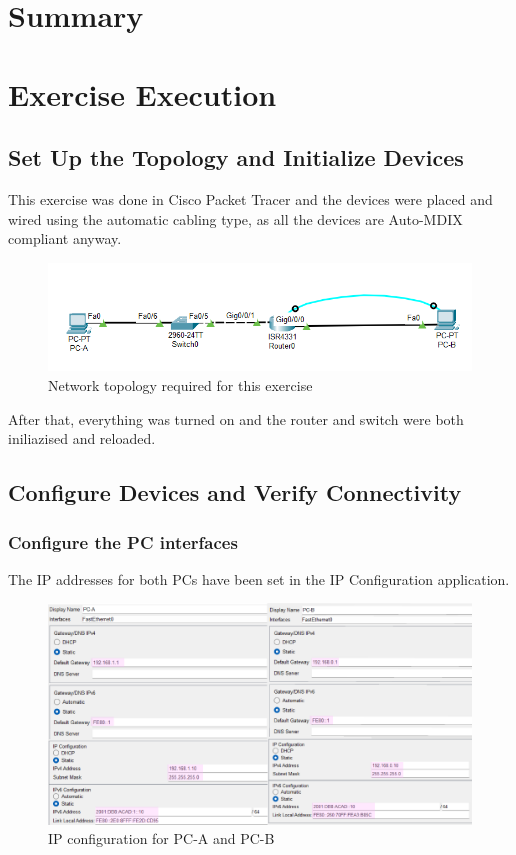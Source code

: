 \documentclass[a4paper]{article}
\newcommand{\abc}{\hfill \break}
\begin{document}
\section{Summary}


\newpage

\section{Exercise Execution}
\subsection{Set Up the Topology and Initialize Devices}
This exercise was done in Cisco Packet Tracer and the devices were placed and wired using the automatic cabling type, as all the devices are Auto-MDIX compliant anyway.\abc
\begin{figure}[h]
	\includegraphics[scale=0.45]{images/nwtopology.png}
	\centering
	\caption{Network topology required for this exercise}
\end{figure}\abc
After that, everything was turned on and the router and switch were both iniliazised and reloaded.

\subsection{Configure Devices and Verify Connectivity}
\subsubsection{Configure the PC interfaces}
The IP addresses for both PCs have been set in the IP Configuration application.
\begin{figure}[h]
	\includegraphics[scale=0.45]{images/pc-ipconf.png}
	\centering
	\caption{IP configuration for PC-A and PC-B}
\end{figure}
\newpage
\end{document}
